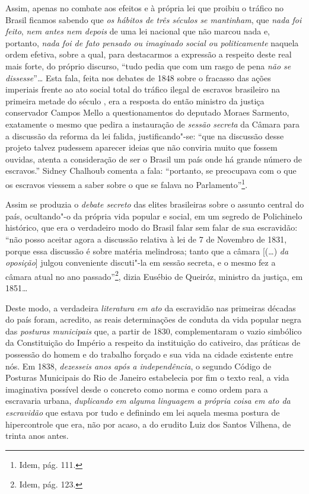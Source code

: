 Assim, apenas no combate aos efeitos e à própria lei que proibiu o
tráfico no Brasil ficamos sabendo que \emph{os hábitos de três séculos
se mantinham}, que \emph{nada foi feito}, \emph{nem antes nem depois} de
uma lei nacional que não marcou nada e, portanto, \emph{nada foi de fato
pensado ou imaginado social ou politicamente} naquela ordem efetiva,
sobre a qual, para destacarmos a expressão a respeito deste real mais
forte, do próprio discurso, ``tudo pedia que com um rasgo de pena
\emph{não se dissesse}''\emph{\ldots{}} Esta fala, feita nos debates de 1848
sobre o fracasso das ações imperiais frente ao ato social total do
tráfico ilegal de escravos brasileiro na primeira metade do século ,
era a resposta do então ministro da justiça conservador Campos Mello a
questionamentos do deputado Moraes Sarmento, exatamente o mesmo que
pedira a instauração de \emph{sessão secreta} da Câmara para a discussão
da reforma da lei falida, justificando"-se: ``que na discussão desse
projeto talvez pudessem aparecer ideias que não conviria muito que
fossem ouvidas, atenta a consideração de ser o Brasil um país onde há
grande número de escravos.'' Sidney Chalhoub comenta a fala: ``portanto,
se preocupava com o que os escravos viessem a saber sobre o que se
falava no Parlamento''\footnote{Idem, pág. 111.}.

Assim se produzia o \emph{debate secreto} das elites brasileiras sobre o
assunto central do país, ocultando"-o da própria vida popular e social,
em um segredo de Polichinelo histórico, que era o verdadeiro modo do
Brasil falar sem falar de sua escravidão: ``não posso aceitar agora a
discussão relativa à lei de 7 de Novembro de 1831, porque essa discussão
é sobre matéria melindrosa; tanto que a câmara {[}(\ldots{}) \emph{da
oposição}{]} julgou conveniente discuti"-la em sessão secreta, e o mesmo
fez a câmara atual no ano passado''\footnote{Idem, pág. 123.}, dizia
Eusébio de Queiróz, ministro da justiça, em 1851\ldots{}

Deste modo, a verdadeira \emph{literatura} \emph{em ato} da escravidão
nas primeiras décadas do país foram, acredito, as reais determinações de
conduta da vida popular negra das \emph{posturas municipais} que, a
partir de 1830, complementaram o vazio simbólico da Constituição do
Império a respeito da instituição do cativeiro, das práticas de
possessão do homem e do trabalho forçado e sua vida na cidade existente
entre nós. Em 1838, \emph{dezesseis anos após a independência}, o
segundo Código de Posturas Municipais do Rio de Janeiro estabelecia por
fim o texto real, a vida imaginativa possível desde o concreto como
norma e como ordem para a escravaria urbana, \emph{duplicando em alguma
linguagem a própria coisa em ato da escravidão} que estava por tudo e
definindo em lei aquela mesma postura de hipercontrole que era, não por
acaso, a do erudito Luiz dos Santos Vilhena, de trinta anos antes.

